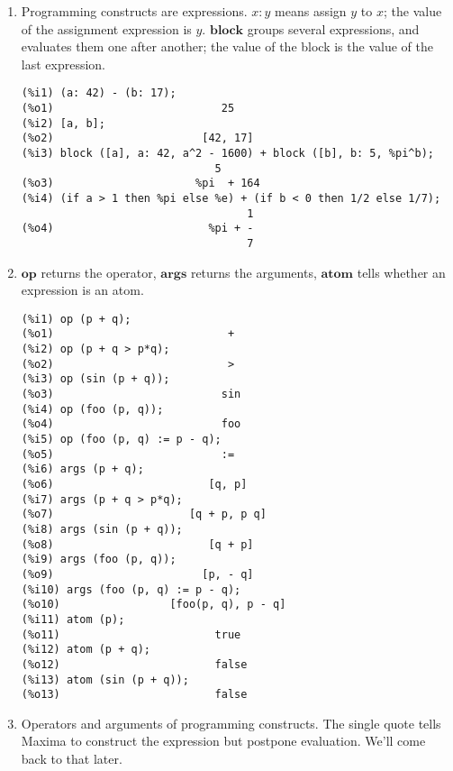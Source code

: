 \documentclass[12pt]{article}
\begin{document}
\begin{enumerate}
\item Programming constructs are expressions. 
$x : y$ means assign $y$ to $x$; the value of the assignment expression is $y$.
$\mathbf{block}$ groups several expressions, and evaluates them one after another;
the value of the block is the value of the last expression.

\begin{verbatim}
(%i1) (a: 42) - (b: 17);
(%o1)                          25
(%i2) [a, b];
(%o2)                       [42, 17]
(%i3) block ([a], a: 42, a^2 - 1600) + block ([b], b: 5, %pi^b);
                              5
(%o3)                      %pi  + 164
(%i4) (if a > 1 then %pi else %e) + (if b < 0 then 1/2 else 1/7);
                                   1
(%o4)                        %pi + -
                                   7
\end{verbatim}

\item $\mathbf{op}$ returns the operator, $\mathbf{args}$ returns the arguments,
$\mathbf{atom}$ tells whether an expression is an atom.

\begin{verbatim}
(%i1) op (p + q);
(%o1)                           +
(%i2) op (p + q > p*q);
(%o2)                           >
(%i3) op (sin (p + q));
(%o3)                          sin
(%i4) op (foo (p, q));
(%o4)                          foo
(%i5) op (foo (p, q) := p - q);
(%o5)                          :=
(%i6) args (p + q);
(%o6)                        [q, p]
(%i7) args (p + q > p*q);
(%o7)                     [q + p, p q]
(%i8) args (sin (p + q));
(%o8)                        [q + p]
(%i9) args (foo (p, q));
(%o9)                       [p, - q]
(%i10) args (foo (p, q) := p - q);
(%o10)                 [foo(p, q), p - q]
(%i11) atom (p);
(%o11)                        true
(%i12) atom (p + q);
(%o12)                        false
(%i13) atom (sin (p + q));
(%o13)                        false
\end{verbatim}

\item Operators and arguments of programming constructs.
The single quote tells Maxima to construct the expression but postpone evaluation.
We'll come back to that later.


\end{enumerate}
\end{document}
